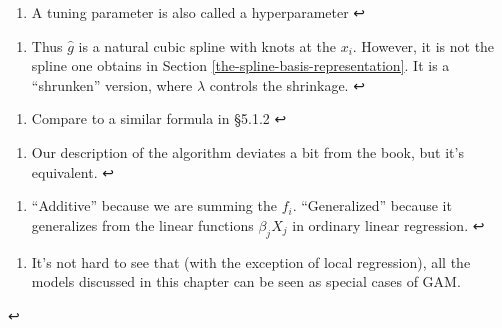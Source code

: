 \documentclass[11pt]{article}
\providecommand{\tightlist}{%
      \setlength{\itemsep}{0pt}\setlength{\parskip}{0pt}}
\begin{document}
\hypertarget{foot58}{}
\begin{enumerate}
\def\labelenumi{\arabic{enumi}.}
\setcounter{enumi}{57}
\tightlist
\item
  A tuning parameter is also called a hyperparameter ↩
\end{enumerate}

\hypertarget{foot59}{}
\begin{enumerate}
\def\labelenumi{\arabic{enumi}.}
\setcounter{enumi}{58}
\tightlist
\item
  Thus \(\hat{g}\) is a natural cubic spline with knots at the \(x_i\).
  However, it is not the spline one obtains in
  Section \ref{the-spline-basis-representation}. It is a ``shrunken''
  version, where \(\lambda\) controls the shrinkage. ↩
\end{enumerate}

\hypertarget{foot60}{}
\begin{enumerate}
\def\labelenumi{\arabic{enumi}.}
\setcounter{enumi}{59}
\tightlist
\item
  Compare to a similar formula in §5.1.2 ↩
\end{enumerate}

\hypertarget{foot61}{}
\begin{enumerate}
\def\labelenumi{\arabic{enumi}.}
\setcounter{enumi}{60}
\tightlist
\item
  Our description of the algorithm deviates a bit from the book, but
  it's equivalent. ↩
\end{enumerate}

\hypertarget{foot62}{}
\begin{enumerate}
\def\labelenumi{\arabic{enumi}.}
\setcounter{enumi}{61}
\tightlist
\item
  ``Additive'' because we are summing the \(f_i\). ``Generalized''
  because it generalizes from the linear functions \(\beta_jX_j\) in
  ordinary linear regression. ↩
\end{enumerate}

\hypertarget{foot63}{}
\begin{enumerate}
\def\labelenumi{\arabic{enumi}.}
\setcounter{enumi}{62}
\tightlist
\item
  It's not hard to see that (with the exception of local regression),
  all the models discussed in this chapter can be seen as special cases
  of GAM.
\end{enumerate}

↩


    
    
    
    
\end{document}

